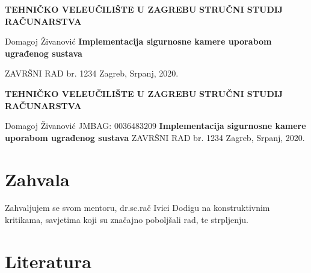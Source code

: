 \documentclass[12pt,a4paper]{article}
\date{}
\newcommand{\collegeName}{TEHNIČKO VELEUČILIŠTE U ZAGREBU}
\newcommand{\smjer}{STRUČNI STUDIJ RAČUNARSTVA}
\newcommand{\radTittle}{Implementacija sigurnosne kamere uporabom ugrađenog sustava}
\newcommand{\radNumber}{1234}
\begin{document}
\begin{center} \obeylines
  {\large \textbf{\collegeName}}
  {\normalsize \textbf{\smjer}}
\end{center}
\begin{center} \obeylines
  \vspace{\fill}
    Domagoj Živanović 
    {\Large \textbf{\radTittle}}
    \item ZAVRŠNI RAD br. \radNumber
  \vspace*{\fill}
  Zagreb, Srpanj, 2020.
\end{center}

\thispagestyle{empty}

\clearpage

\begin{center} \obeylines
  {\large \textbf{\collegeName}}
  {\normalsize \textbf{\smjer}}
\end{center}
\begin{center} \obeylines
  \vspace{\fill}
      Domagoj Živanović
      JMBAG: 0036483209
    {\Large \textbf{\radTittle}}
    ZAVRŠNI RAD br. \radNumber
  \vspace*{\fill}
  Zagreb, Srpanj, 2020.
\end{center}

\thispagestyle{empty}

\clearpage
\section*{Zahvala}
Zahvaljujem se svom mentoru, dr.sc.rač Ivici Dodigu na konstruktivnim kritikama, savjetima koji su značajno poboljšali
rad, te strpljenju.
\clearpage



\tableofcontents
\clearpage

\listoftables
\listoffigures


% 




\section{Literatura}
\printbibliography[heading=none]
\end{document}
